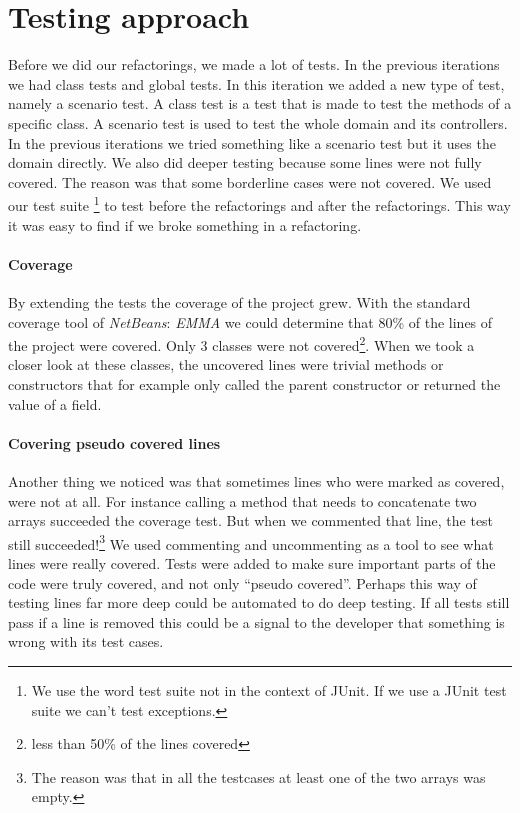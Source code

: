 \section{Testing approach}
Before we did our refactorings, we made a lot of tests. In the previous iterations we had class tests and global tests. In this iteration we added a new type of test, namely a scenario test. A class test is a test that is made to test the methods of a specific class. A scenario test is used to test the whole domain and its controllers. In the previous iterations we tried something like a scenario test but it uses the domain directly. We also did deeper testing because some lines were not fully covered. The reason was that some borderline cases were not covered. We used our test suite \footnote{We use the word test suite not in the context of JUnit. If we use a JUnit test suite we can't test exceptions.} to test before the refactorings and after the refactorings. This way it was easy to find if we broke something in a refactoring.

\paragraph{Coverage}
By extending the tests the coverage of the project grew. With the standard coverage tool of \textit{NetBeans}: \textit{EMMA} we could determine that 80\% of the lines of the project were covered. Only 3 classes were not covered\footnote{less than 50\% of the lines covered}. When we took a closer look at these classes, the uncovered lines were trivial methods or constructors that for example only called the parent constructor or returned the value of a field.
\paragraph{Covering pseudo covered lines}Another thing we noticed was that sometimes lines who were marked as covered, were not at all. For instance calling a method that needs to concatenate two arrays succeeded the coverage test. But when we commented that line, the test still succeeded!\footnote{The reason was that in all the testcases at least one of the two arrays was empty.} We used commenting and uncommenting as a tool to see what lines were really covered. Tests were added to make sure important parts of the code were truly covered, and not only ``pseudo covered''. Perhaps this way of testing lines far more deep could be automated to do deep testing. If all tests still pass if a line is removed this could be a signal to the developer that something is wrong with its test cases.
